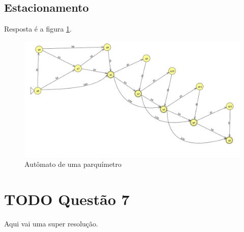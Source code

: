 \documentclass[11pt]{article}
\begin{document}
\subsection{Estacionamento}
\label{sec:org7f77153}
Resposta é a figura \ref{fig:org81c4e14}.
\begin{figure}[htbp]
\centering
\includegraphics[width=.9\linewidth]{./q6/estacionamento.jpg}
\caption{\label{fig:org81c4e14}
Autômato de uma parquímetro}
\end{figure}
\section{{\bfseries\sffamily TODO} Questão 7}
\label{sec:orga96e2e0}
Aqui vai uma super resolução.
\end{document}
